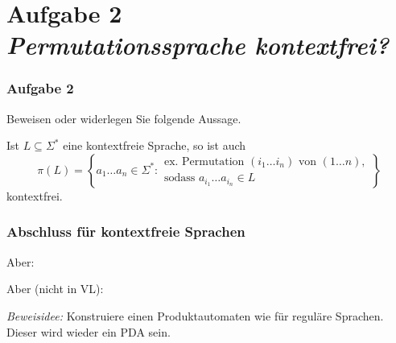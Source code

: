 \documentclass{beamer}
\newcommand{\ghost}[1]{\raisebox{0pt}[0pt][0pt]{\makebox[0pt][l]{#1}}}
\begin{document}
	

	\section{Aufgabe 2 \\ \itshape Permutationssprache kontextfrei?}
	
	\newcommand{\mytabnote}[2]{\ghost{#1}\hspace{2cm}{\textcolor{cdgray}{(#2)}}}

	

	\begin{frame} \frametitle{Aufgabe 2}
		\small
		Beweisen oder widerlegen Sie folgende Aussage.
		
		Ist $L \subseteq \Sigma^\ast $ eine kontextfreie Sprache, so ist auch
		$$\pi(L) = \left\{ a_1 \ldots a_n \in \Sigma^\ast : \begin{array}{l} \text{ex. Permutation } (i_1 \ldots i_n) \text{ von } (1 \ldots n), \\ \text{sodass }  a_{i_1} \ldots a_{i_n} \in L \end{array} \right\} $$
		kontextfrei.
	\end{frame}

	\begin{frame}\frametitle{Abschluss für kontextfreie Sprachen}
		\small
		
		Aber: 
		
		
		Aber (nicht in VL):
		
		\textit{Beweisidee:} Konstruiere einen Produktautomaten wie für reguläre Sprachen. Dieser wird wieder ein PDA sein.
	\end{frame}
\end{document}
